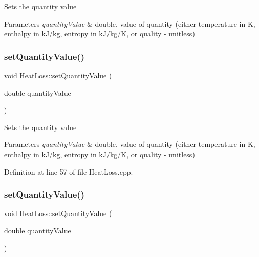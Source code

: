 Sets the quantity value 
\begin{DoxyParams}{Parameters}
{\em quantity\+Value} & double, value of quantity (either temperature in K, enthalpy in k\+J/kg, entropy in k\+J/kg/K, or quality -\/ unitless) \\
\hline
\end{DoxyParams}
\mbox{\label{class_heat_loss_ae6b6c4ac28471d7bc94e3886c48a90bd}} 
\subsubsection{\texorpdfstring{set\+Quantity\+Value()}{setQuantityValue()}\hspace{0.1cm}{\footnotesize\ttfamily [2/3]}}
{\footnotesize\ttfamily void Heat\+Loss\+::set\+Quantity\+Value (\begin{DoxyParamCaption}\item[{double}]{quantity\+Value }\end{DoxyParamCaption})}

Sets the quantity value 
\begin{DoxyParams}{Parameters}
{\em quantity\+Value} & double, value of quantity (either temperature in K, enthalpy in k\+J/kg, entropy in k\+J/kg/K, or quality -\/ unitless) \\
\hline
\end{DoxyParams}


Definition at line 57 of file Heat\+Loss.\+cpp.

\mbox{\label{class_heat_loss_ae6b6c4ac28471d7bc94e3886c48a90bd}} 
\subsubsection{\texorpdfstring{set\+Quantity\+Value()}{setQuantityValue()}\hspace{0.1cm}{\footnotesize\ttfamily [3/3]}}
{\footnotesize\ttfamily void Heat\+Loss\+::set\+Quantity\+Value (\begin{DoxyParamCaption}\item[{double}]{quantity\+Value }\end{DoxyParamCaption})}

